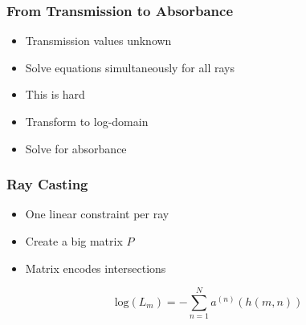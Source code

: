 \documentclass[12pt, compress]{beamer}
\begin{document}
\begin{frame}[fragile]
	\frametitle{From Transmission to Absorbance}
	
	\begin{itemize}[<+- | alert@+>]
		\item Transmission values unknown
		\item Solve equations simultaneously for all rays
		\item This is hard
		\item Transform to log-domain
		\item Solve for absorbance
	\end{itemize}
	
\end{frame}

\begin{frame}[fragile]
	\frametitle{Ray Casting}
	
	\begin{itemize}[<alert@+>]
		\item One linear constraint per ray
		\item Create a big matrix $P$
		\item Matrix encodes intersections
	\end{itemize}
	\vspace{2cm}
	\begin{equation*}
			\text{log}(L_m) = -\sum_{n=1}^{N} a^{(n)} (h(m, n)) 
	\end{equation*}
	
\end{frame}
\end{document}
